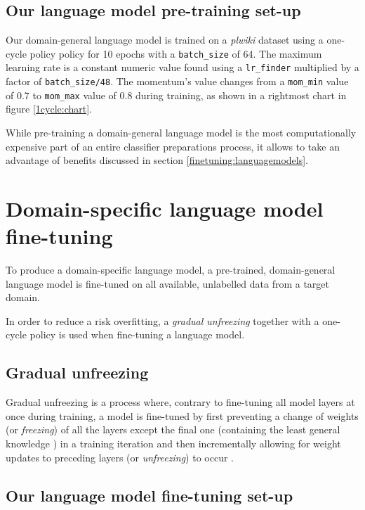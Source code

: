\subsection{Our language model pre-training set-up}
\label{our:lm}

Our domain-general language model is trained on a \emph{plwiki} dataset using a one-cycle policy policy for 10 epochs with a \lstinline{batch_size} of 64. The maximum learning rate is a constant numeric value found using a \lstinline{lr_finder} \cite{gugger:lrfinder} multiplied by a factor of \lstinline{batch_size/48}. The momentum's value changes from a \lstinline{mom_min} value of 0.7 to \lstinline{mom_max} value of 0.8 during training, as shown in a rightmost chart in figure \ref{1cycle:chart}.

While pre-training a domain-general language model is the most computationally expensive part of an entire classifier preparations process, it allows to take an advantage of benefits discussed in section \ref{finetuning:languagemodels}.

\section{Domain-specific language model fine-tuning}

To produce a domain-specific language model, a pre-trained, domain-general language model is fine-tuned on all available, unlabelled data from a target domain.

In order to reduce a risk overfitting, a \emph{gradual unfreezing} together with a one-cycle policy is used when fine-tuning a language model.

\subsection{Gradual unfreezing}

Gradual unfreezing is a process where, contrary to fine-tuning all model layers at once during training, a model is fine-tuned by first preventing a change of weights (or \emph{freezing}) of all the layers except the final one (containing the least general knowledge \cite{yosinski:transferable}) in a training iteration and then incrementally allowing for weight updates to preceding layers (or \emph{unfreezing}) to occur \cite{ulmfit}.

\subsection{Our language model fine-tuning set-up}
\label{our:lmft}

